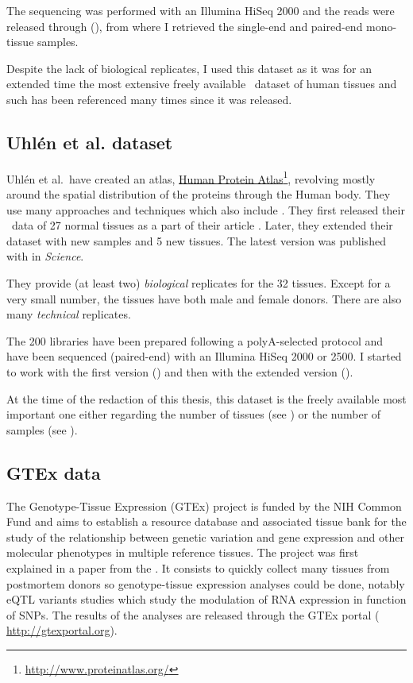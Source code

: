 The sequencing was performed with an Illumina HiSeq 2000 and the reads were
released through  (), from where I
retrieved the single-end and paired-end mono-tissue samples.

Despite the lack of biological replicates, I used this dataset as it was for an
extended time the most extensive freely available \Rnaseq\ dataset of human
tissues and such has been referenced many times since it was released.

\subsection{Uhlén et al. dataset}

Uhlén et al.\ have created an atlas,
\href{http://www.proteinatlas.org/}{Human Protein Atlas}\footnote{%
\href{http://www.proteinatlas.org/}{http://www.proteinatlas.org/}},
revolving mostly around the spatial
distribution of the proteins through the Human body. They use many approaches
and techniques which also include \Rnaseq. They first released their \Rnaseq\
data of 27 normal tissues as a part of their article 
\citep{Uhlen2014}. Later, they extended their dataset with new samples and 5 new
tissues. The latest version was published with \paper{\citetitle{Uhlen2015}}
\citep{Uhlen2015} in \textit{Science}.

They provide (at least two) \emph{biological} replicates for the 32 tissues.
Except for a very small number, the tissues have both male and female donors.
There are also many \emph{technical} replicates.

The 200 libraries have been prepared following a polyA-selected protocol and
have been sequenced (paired-end) with an Illumina HiSeq 2000 or 2500. I started
to work with the first version (\ArrayExpress{E-MTAB-1733}) and then
with the extended version (\ArrayExpress{E-MTAB-2836}).

At the time of the redaction of this thesis, this dataset is the freely available
most important one either regarding the number of tissues
(see ) or the number of samples (see ).


\subsection{GTEx data}

The Genotype-Tissue Expression (\gls{GTEx}) project is funded by the \gls{NIH}
Common Fund and aims to establish a resource database and associated tissue bank
for the study of the relationship between genetic variation and gene expression
and other molecular phenotypes in multiple reference tissues. The project was first
explained in a paper from the \cite{GTEx2013}. It consists to quickly collect
many tissues from postmortem donors so genotype-tissue expression analyses could
be done, notably \gls{eQTL} variants studies which study the modulation
of \gls{RNA} expression in function of \glspl{SNP}. The results of the
analyses are released through the GTEx portal (%
\href{http://gtexportal.org}{http://gtexportal.org}).

